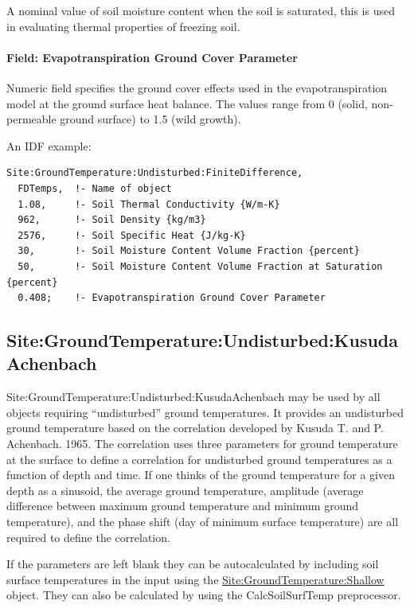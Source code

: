 A nominal value of soil moisture content when the soil is saturated, this is used in evaluating thermal properties of freezing soil.

\paragraph{Field: Evapotranspiration Ground Cover Parameter}\label{field-evapotranspiration-ground-cover-parameter}

Numeric field specifies the ground cover effects used in the evapotranspiration model at the ground surface heat balance. The values range from 0 (solid, non-permeable ground surface) to 1.5 (wild growth).

An IDF example:

\begin{lstlisting}
Site:GroundTemperature:Undisturbed:FiniteDifference,
  FDTemps,  !- Name of object
  1.08,     !- Soil Thermal Conductivity {W/m-K}
  962,      !- Soil Density {kg/m3}
  2576,     !- Soil Specific Heat {J/kg-K}
  30,       !- Soil Moisture Content Volume Fraction {percent}
  50,       !- Soil Moisture Content Volume Fraction at Saturation {percent}
  0.408;    !- Evapotranspiration Ground Cover Parameter
\end{lstlisting}

\subsection{Site:GroundTemperature:Undisturbed:KusudaAchenbach}\label{sitegroundtemperatureundisturbedkusudaachenbach}

Site:GroundTemperature:Undisturbed:KusudaAchenbach may be used by all objects requiring ``undisturbed'' ground temperatures. It provides an undisturbed ground temperature based on the correlation developed by Kusuda T. and P. Achenbach. 1965. The correlation uses three parameters for ground temperature at the surface to define a correlation for undisturbed ground temperatures as a function of depth and time. If one thinks of the ground temperature for a given depth as a sinusoid, the average ground temperature, amplitude (average difference between maximum ground temperature and minimum ground temperature), and the phase shift (day of minimum surface temperature) are all required to define the correlation.

If the parameters are left blank they can be autocalculated by including soil surface temperatures in the input using the \hyperref[sitegroundtemperatureshallow]{Site:GroundTemperature:Shallow} object. They can also be calculated by using the CalcSoilSurfTemp preprocessor.

